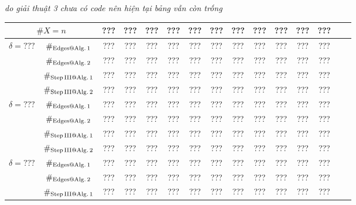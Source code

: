 \documentclass[12pt,a4paper,openany,oneside]{report}
\begin{document}
\textit{do giải thuật 3 chưa có code nên hiện tại bảng vẫn còn trống}
\begin{table}[ht]
	\begin{center}\renewcommand{\arraystretch}{1.2}\small
		\setlength\tabcolsep{0.05cm}
		\begin{tabular}{|c|c||c|c|c|c|c|c|c|c|c|c|c|c|c|}
			\hline
			\multicolumn {2}{|c||}{\footnotesize $\#X=n$}  & ???& ???& ???& ???& ???& ???& ???& ???& ???& ???& ??? \\ 
			\hline		
			\hline
			{ $\delta = ???$}
			
			& $\#_{\rm Edges@ Alg.\, 1}$  &   ???& ???& ???& ???& ???& ???& ???& ???& ???& ???& ??? \\
			
			& $\#_{\rm Edges@ Alg.\, 2}$  &   ???& ???& ???& ???& ???& ???& ???& ???& ???& ???& ??? \\
			
			& $\#_{\rm Step\, III @ Alg.\, 1}$  &   ???& ???& ???& ???& ???& ???& ???& ???& ???& ???& ??? \\
			
			& $\#_{\rm Step\, III @ Alg.\, 2}$& ???& ???& ???& ???& ???& ???& ???& ???& ???& ???& ???   \\
			\hline
			{ $\delta = ???$}
			
			& $\#_{\rm Edges@ Alg.\, 1}$  &   ???& ???& ???& ???& ???& ???& ???& ???& ???& ???& ??? \\
			
			& $\#_{\rm Edges@ Alg.\, 2}$  &   ???& ???& ???& ???& ???& ???& ???& ???& ???& ???& ??? \\
			
			& $\#_{\rm Step\, III @ Alg.\, 1}$  &   ???& ???& ???& ???& ???& ???& ???& ???& ???& ???& ??? \\
			
			& $\#_{\rm Step\, III @ Alg.\, 2}$& ???& ???& ???& ???& ???& ???& ???& ???& ???& ???& ???   \\
			\hline
			{ $\delta = ???$}
			
			& $\#_{\rm Edges@ Alg.\, 1}$  &   ???& ???& ???& ???& ???& ???& ???& ???& ???& ???& ??? \\
			
			& $\#_{\rm Edges@ Alg.\, 2}$  &   ???& ???& ???& ???& ???& ???& ???& ???& ???& ???& ??? \\
			
			& $\#_{\rm Step\, III @ Alg.\, 1}$  &   ???& ???& ???& ???& ???& ???& ???& ???& ???& ???& ??? \\
			

\end{tabular}
\end{center}
\end{table}
\end{document}
